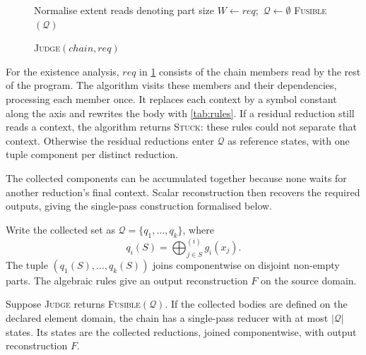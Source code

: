 \begingroup
\setlength{\intextsep}{2pt}
\begin{figure}
\begin{minipage}{\linewidth}
\begin{algorithm}[H]
\small
\caption{\textsc{Judge}$(\mathit{chain}, \mathit{req})$}
\label{alg:judge}
Normalise extent reads denoting part size\;
$W\leftarrow \mathit{req}$;\ $\mathcal Q\leftarrow\emptyset$\;
\Return \textsc{Fusible}$(\mathcal Q)$\;
\end{algorithm}
\end{minipage}
\end{figure}
For the existence analysis, $\mathit{req}$ in \cref{alg:judge} consists of the chain members read by the rest of the program.
The algorithm visits these members and their dependencies, processing each member once.
It replaces each context by a symbol constant along the axis and rewrites the body with \cref{tab:rules}.
If a residual reduction still reads a context, the algorithm returns \textsc{Stuck}: these rules could not separate that context.
Otherwise the residual reductions enter $\mathcal Q$ as reference states, with one tuple component per distinct reduction.

The collected components can be accumulated together because none waits for another reduction's final context.
Scalar reconstruction then recovers the required outputs, giving the single-pass construction formalised below.

\finishwrapspace
\endgroup

Write the collected set as $\mathcal Q=\{q_1,\dots,q_k\}$, where
\[
q_i(S)=\bigoplus_{j\in S}^{(i)}g_i(x_j).
\]
The tuple $(q_1(S),\dots,q_k(S))$ joins componentwise on disjoint non-empty parts.
The algebraic rules give an output reconstruction $F$ on the source domain.

\begin{theorem}[Existence]
\label{thm:existence}
Suppose \textsc{Judge} returns \textsc{Fusible}$(\mathcal Q)$.
If the collected bodies are defined on the declared element domain, the chain has a single-pass reducer with at most $|\mathcal Q|$ states.
Its states are the collected reductions, joined componentwise, with output reconstruction $F$.
\end{theorem}

